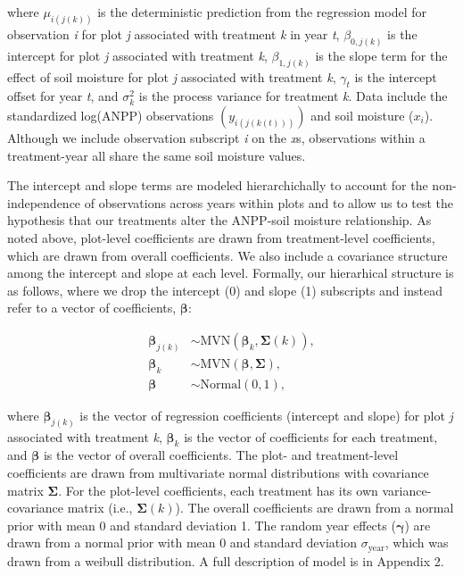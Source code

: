 \documentclass[fleqn,10pt,lineno]{wlpeerj} %
\begin{document}
\noindent{}where \(\mu_{i(j(k))}\) is the deterministic prediction from
the regression model for observation \emph{i} for plot \emph{j}
associated with treatment \emph{k} in year \emph{t}, \(\beta_{0,j(k)}\)
is the intercept for plot \emph{j} associated with treatment \emph{k},
\(\beta_{1,j(k)}\) is the slope term for the effect of soil moisture for
plot \emph{j} associated with treatment \emph{k}, \(\gamma_t\) is the
intercept offset for year \emph{t}, and \(\sigma^2_k\) is the process
variance for treatment \emph{k}. Data include the standardized log(ANPP)
observations \(\left( y_{i(j(k(t)))} \right)\) and soil moisture
(\(x_i\)). Although we include observation subscript \emph{i} on the
\emph{x}s, observations within a treatment-year all share the same soil
moisture values.

The intercept and slope terms are modeled hierarchichally to account for
the non-independence of observations across years within plots and to
allow us to test the hypothesis that our treatments alter the ANPP-soil
moisture relationship. As noted above, plot-level coefficients are drawn
from treatment-level coefficients, which are drawn from overall
coefficients. We also include a covariance structure among the intercept
and slope at each level. Formally, our hierarhical structure is as
follows, where we drop the intercept (0) and slope (1) subscripts and
instead refer to a vector of coefficients, \(\boldsymbol{\beta}\):

\vspace{-1em}

\begin{align}
\boldsymbol{\beta}_{j(k)} &\sim \text{MVN} \left( \boldsymbol{\beta}_k, \boldsymbol{\Sigma}(k) \right), \\
\boldsymbol{\beta}_{k} &\sim \text{MVN} \left( \boldsymbol{\beta}, \boldsymbol{\Sigma}  \right), \\
\boldsymbol{\beta} &\sim \text{Normal} \left( 0, 1 \right),
\end{align}

\noindent{}where \(\boldsymbol{\beta}_{j(k)}\) is the vector of
regression coefficients (intercept and slope) for plot \emph{j}
associated with treatment \emph{k}, \(\boldsymbol{\beta}_{k}\) is the
vector of coefficients for each treatment, and \(\boldsymbol{\beta}\) is
the vector of overall coefficients. The plot- and treatment-level
coefficients are drawn from multivariate normal distributions with
covariance matrix \(\boldsymbol{\Sigma}\). For the plot-level
coefficients, each treatment has its own variance-covariance matrix
(i.e., \(\boldsymbol{\Sigma}(k)\)). The overall coefficients are drawn
from a normal prior with mean 0 and standard deviation 1. The random
year effects (\(\boldsymbol{\gamma}\)) are drawn from a normal prior
with mean 0 and standard deviation \(\sigma_{\text{year}}\), which was
drawn from a weibull distribution. A full description of model is in
Appendix 2.
\end{document}
